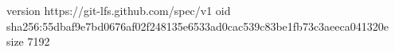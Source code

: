 version https://git-lfs.github.com/spec/v1
oid sha256:55dbaf9e7bd0676af02f248135e6533ad0cac539c83be1fb73c3aeeca041320e
size 7192
